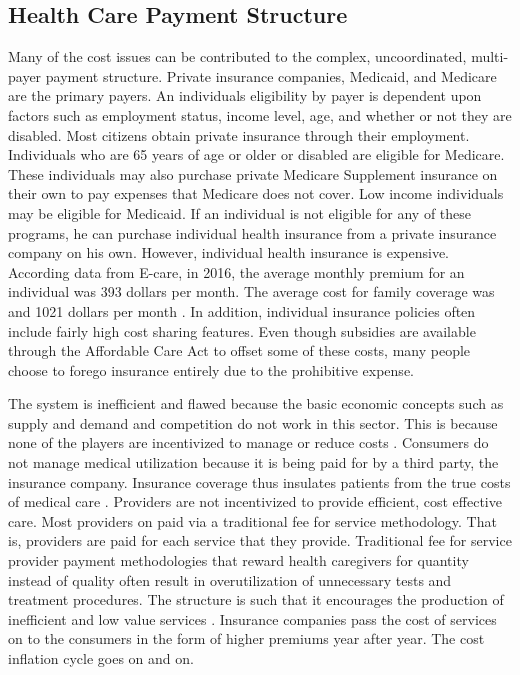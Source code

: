 \documentclass[sigconf]{acmart}
\begin{document}
\subsection{Health Care Payment Structure}
Many of the cost issues can be contributed to the complex, uncoordinated, multi-payer payment structure. Private insurance companies, Medicaid, and Medicare are the primary payers.  An individuals eligibility by payer is dependent upon factors such as employment status, income level, age, and whether or not they are disabled.  Most citizens obtain private insurance through their employment. Individuals who are 65 years of age or older or disabled are eligible for Medicare. These individuals may also purchase private Medicare Supplement insurance on their own to pay expenses that Medicare does not cover. Low income individuals may be eligible for Medicaid. If an individual is not eligible for any of these programs, he can purchase individual health insurance from a private insurance company on his own.  However, individual health insurance is expensive.  According data from E-care, in 2016, the average monthly premium for an individual was 393 dollars per month. The average cost for family coverage was and 1021 dollars per month \cite{www-google-cost}. In addition, individual insurance policies often include fairly high cost sharing features. Even though subsidies are available through the Affordable Care Act to offset some of these costs, many people choose to forego insurance entirely due to the prohibitive expense.


The system is inefficient and flawed because the basic economic concepts such as supply and demand and competition do not work in this sector. This is because none of the players are incentivized to manage or reduce costs \cite{milbank}.  Consumers do not manage medical utilization because it is being paid for by a third party, the insurance company.  Insurance coverage thus insulates patients from the true costs of medical care \cite{milbank}. Providers are not incentivized to provide efficient, cost effective care. Most providers on paid via a traditional fee for service methodology. That is, providers are paid for each service that they provide. Traditional fee for service provider payment methodologies that reward health caregivers for quantity instead of quality often result in overutilization of unnecessary tests and treatment procedures.  The structure is such that it encourages the production of inefficient and low value services \cite{milbank}.   Insurance companies pass the cost of services on to the consumers in the form of higher premiums year after year. The cost inflation cycle goes on and on.  
\end{document}
